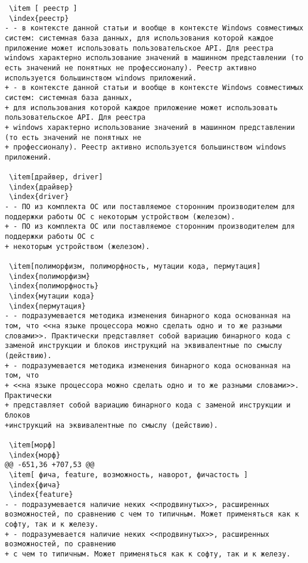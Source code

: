\begin{verbatim}
 \item [ реестр ]
 \index{реестр}
- - в контексте данной статьи и вообще в контексте Windows совместимых систем: системная база данных, для использования которой каждое приложение может использовать пользовательское API. Для реестра windows характерно использование значений в машинном представлении (то есть значений не понятных не профессионалу). Реестр активно используется большинством windows приложений.
+ - в контексте данной статьи и вообще в контексте Windows совместимых систем: системная база данных,
+ для использования которой каждое приложение может использовать пользовательское API. Для реестра
+ windows характерно использование значений в машинном представлении (то есть значений не понятных не
+ профессионалу). Реестр активно используется большинством windows приложений.

 \item[драйвер, driver]
 \index{драйвер}
 \index{driver}
- - ПО из комплекта ОС или поставляемое сторонним производителем для поддержки работы ОС с некоторым устройством (железом).
+ - ПО из комплекта ОС или поставляемое сторонним производителем для поддержки работы ОС с
+ некоторым устройством (железом).

 \item[полиморфизм, полиморфность, мутации кода, пермутация]
 \index{полиморфизм}
 \index{полиморфность}
 \index{мутации кода}
 \index{пермутация}
- - подразумевается методика изменения бинарного кода основанная на том, что <<на языке процессора можно сделать одно и то же разными словами>>. Практически представляет собой вариацию бинарного кода с заменой инструкции и блоков инструкций на эквивалентные по смыслу (действию).
+ - подразумевается методика изменения бинарного кода основанная на том, что
+ <<на языке процессора можно сделать одно и то же разными словами>>. Практически
+ представляет собой вариацию бинарного кода с заменой инструкции и блоков
+инструкций на эквивалентные по смыслу (действию).

 \item[морф]
 \index{морф}
@@ -651,36 +707,53 @@
 \item[ фича, feature, возможность, наворот, фичастость ]
 \index{фича}
 \index{feature}
- - подразумевается наличие неких <<продвинутых>>, расширенных возможностей, по сравнению с чем то типичным. Может применяться как к софту, так и к железу.
+ - подразумевается наличие неких <<продвинутых>>, расширенных возможностей, по сравнению
+ с чем то типичным. Может применяться как к софту, так и к железу.


\end{verbatim}
